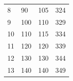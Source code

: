 \documentclass[12pt]{article}
\begin{document}
\begin{table}
\begin{tabular}{|p{0.5cm}|p{3cm}|p{4cm}|p{4cm}|}
            8  & 90                                & 105                                              & 324                                         \\
            9  & 100                               & 110                                              & 329                                         \\
            10 & 110                               & 115                                              & 334                                         \\
            11 & 120                               & 120                                              & 339                                         \\
            12 & 130                               & 130                                              & 344                                         \\
            13 & 140                               & 140                                              & 349                                         \\\hline
        \end{tabular}
    \end{table}
\end{document}
